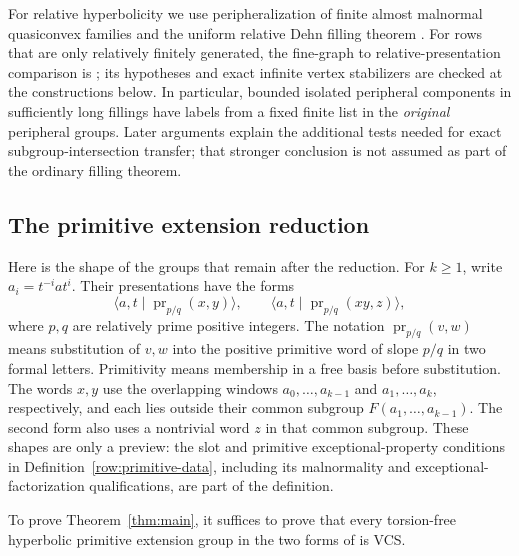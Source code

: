 For relative hyperbolicity we use peripheralization of finite almost malnormal quasiconvex families and the uniform relative Dehn filling theorem \cite{Bowditch2012,Osin2006,Osin2007}. For rows that are only relatively finitely generated, the fine-graph to relative-presentation comparison is \cite[Proposition~3.47]{GerasimovPotyagailo2015}; its hypotheses and exact infinite vertex stabilizers are checked at the constructions below. In particular, bounded isolated peripheral components in sufficiently long fillings have labels from a fixed finite list in the \emph{original} peripheral groups. Later arguments explain the additional tests needed for exact subgroup-intersection transfer; that stronger conclusion is not assumed as part of the ordinary filling theorem.

\subsection{The primitive extension reduction}

Here is the shape of the groups that remain after the reduction. For
$k\ge1$, write $a_i=t^{-i}at^i$. Their presentations have the forms
\[
 \langle a,t\mid\operatorname{pr}_{p/q}(x,y)\rangle,
 \qquad
 \langle a,t\mid\operatorname{pr}_{p/q}(xy,z)\rangle,
\]
where $p,q$ are relatively prime positive integers. The notation
$\operatorname{pr}_{p/q}(v,w)$ means substitution of $v,w$ into the
positive primitive word of slope $p/q$ in two formal letters. Primitivity
means membership in a free basis before substitution. The words $x,y$
use the overlapping windows $a_0,\ldots,a_{k-1}$ and
$a_1,\ldots,a_k$, respectively, and each lies outside their common
subgroup $F(a_1,\ldots,a_{k-1})$. The second form also uses a nontrivial
word $z$ in that common subgroup. These shapes are only a preview:
the slot and primitive exceptional-property conditions in
Definition~\ref{row:primitive-data}, including its malnormality and
exceptional-factorization qualifications, are part of the definition.

\begin{proposition}[Reduction]\label{prop:primitive-reduction}
To prove Theorem~\ref{thm:main}, it suffices to prove that every torsion-free hyperbolic primitive extension group in the two forms of \cite[Section~5]{LintonHyperbolic2026} is VCS.
\end{proposition}

